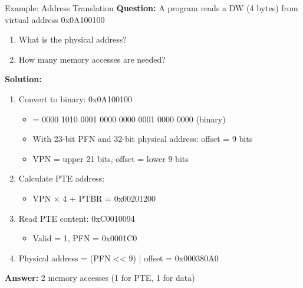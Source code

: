 \documentclass[aspectratio=169,12pt]{beamer}
\begin{document}
\begin{frame}{Example: Address Translation}
\textbf{Question:} A program reads a DW (4 bytes) from virtual address 0x0A100100
\begin{enumerate}
\item What is the physical address?
\item How many memory accesses are needed?
\end{enumerate}

\textbf{Solution:}
\begin{enumerate}
\item Convert to binary: 0x0A100100
\begin{itemize}
  \item = 0000 1010 0001 0000 0000 0001 0000 0000 (binary)
  \item With 23-bit PFN and 32-bit physical address: offset = 9 bits
  \item VPN = upper 21 bits, offset = lower 9 bits
\end{itemize}
\item Calculate PTE address:
\begin{itemize}
  \item VPN × 4 + PTBR = 0x00201200
\end{itemize}
\item Read PTE content: 0xC0010094
\begin{itemize}
  \item Valid = 1, PFN = 0x0001C0
\end{itemize}
\item Physical address = (PFN << 9) | offset = 0x000380A0
\end{enumerate}

\textbf{Answer:} 2 memory accesses (1 for PTE, 1 for data)
\end{frame}
\end{document}
